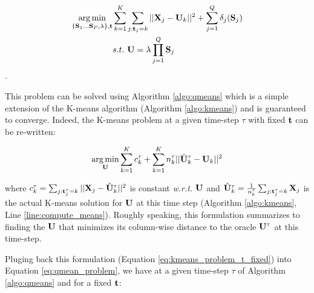 \documentclass{article}
\begin{document}
\begin{equation}
\begin{split}
\label{eq:qmean_problem}
    \operatorname*{arg\,min}_{\{{\mathbf{S}}_1 \dots {\mathbf{S}}_P, \lambda\}, {\mathbf{t}}} & \sum_{k=1}^{K} \sum_{j: {\mathbf{t}}_j = k} ||{\mathbf{X}}_j -{\mathbf{U}}_k||^2 + \sum_{j=1}^{Q} \delta_j({\mathbf{S}}_j) \\
    & s.t. ~ {\mathbf{U}} = \lambda \prod_{j=1}^{Q}{{\mathbf{S}}_j}
\end{split}
\end{equation}.

This problem can be solved using Algorithm \ref{algo:qmeans} which is a simple extension of the K-means algorithm (Algorithm \ref{algo:kmeans}) and is guaranteed to converge. Indeed, the K-means problem at a given time-step $\tau$ with fixed ${\mathbf{t}}$ can be re-written:

\begin{equation}
\label{eq:kmeans_problem_t_fixed}
\begin{split}
 \operatorname*{arg\,min}_{{\mathbf{U}}} & \sum_{k=1}^{K} c_k^\tau + \sum_{k=1}^{K} n_k^\tau||\hat{{\mathbf{U}}}^\tau_k - {\mathbf{U}}_k||^2 \\
\end{split}
\end{equation} 

where $c^\tau_k = \sum_{j: {\mathbf{t}}^\tau_j = k} {||{\mathbf{X}}_j - \hat{{\mathbf{U}}}^\tau_k||^2}$ is constant \textit{w.r.t.} ${\mathbf{U}}$ and $\hat{{\mathbf{U}}}^\tau_k = \frac{1}{n^\tau_k} \sum_{j: {\mathbf{t}}^\tau_j = k} {{\mathbf{X}}_j}$ is the actual K-means solution for ${\mathbf{U}}$ at this time step (Algorithm \ref{algo:kmeans}, Line \ref{line:compute_means}). Roughly speaking, this formulation summarizes to finding the ${\mathbf{U}}$ that minimizes its column-wise distance to the oracle ${\mathbf{U}}^\tau$ at this time-step.

Pluging back this formulation (Equation \ref{eq:kmeans_problem_t_fixed}) into Equation \ref{eq:qmean_problem}, we have at a given time-step $\tau$ of Algorithm \ref{algo:qmeans} and for a fixed ${\mathbf{t}}$:
\end{document}
